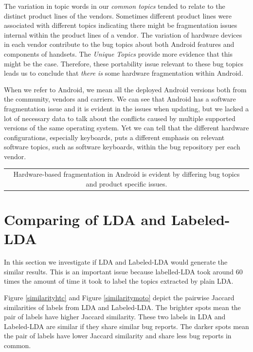 \documentclass[10pt, conference, compsocconf]{IEEEtran}
\begin{document}
The variation in topic words in our \emph{common topics} tended to
relate to the distinct product lines of the vendors. Sometimes
different product lines were associated with different topics
indicating there might be fragmentation issues internal within the
product lines of a vendor.  The variation of hardware devices in each
vendor contribute to the bug topics about both Android features and
components of handsets. The \textit{Unique Topics} provide more
evidence that this might be the case.  Therefore, these portability
issue relevant to these bug topics leads us to conclude that \emph{there is}
some hardware fragmentation within Android.

When we refer to Android, we mean all the deployed Android versions
both from the community, vendors and carriers. We can see that Android
has a software fragmentation issue and it is evident in the issues
when updating, but we lacked a lot of necessary data to talk about the
conflicts caused by multiple supported versions of the same operating
system. Yet we can tell that the different hardware configurations,
especially keyboards, puts a different emphasis on relevant software
topics, such as software keyboards, within the bug repository per each
vendor.

\vspace*{0.5em}
\begin{tabular}{|c|}
\hline 
\parbox{3.0in}{\centering Hardware-based fragmentation in Android is
  evident by differing bug topics and product specific
  issues.}
\\
\hline
\end{tabular}


\section{Comparing of LDA and Labeled-LDA}
\label{sec:comparinglda}

In this section we investigate if LDA and Labeled-LDA would generate
the similar results. This is an important issue because labelled-LDA
took around 60 times the amount of time it took to label the topics
extracted by plain LDA.

Figure \ref{similarityhtc} and Figure \ref{similaritymoto} depict the
pairwise Jaccard similarities of labels from LDA and Labeled-LDA. The
brighter spots mean the pair of labels have higher Jaccard
similarity. These two labels in LDA and Labeled-LDA are similar if
they share similar bug reports. The darker spots mean the pair of
labels have lower Jaccard similarity and share less bug reports in
common. 
\end{document}

